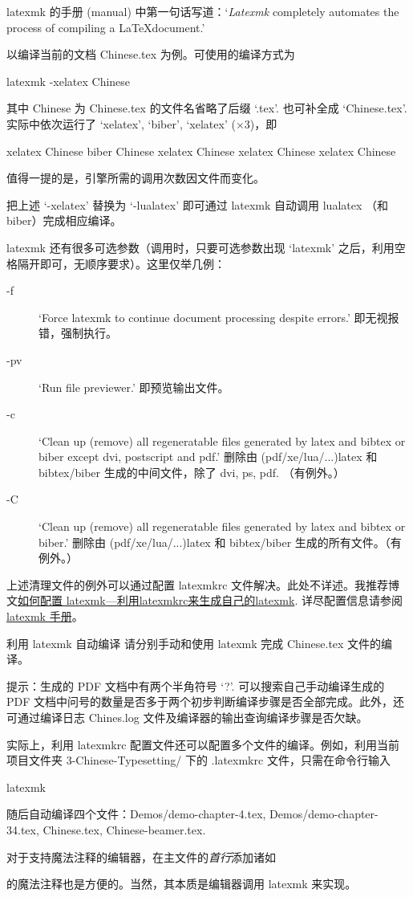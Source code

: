 latexmk 的手册 (manual)\cite{latexmk} 中第一句话写道：`\emph{Latexmk} completely automates the process of compiling a \LaTeX document.'

以编译当前的文档 Chinese.tex 为例。可使用的编译方式为
\begin{bashlst}
latexmk -xelatex Chinese
\end{bashlst}
其中 Chinese 为 Chinese.tex 的文件名省略了后缀 `.tex'. 也可补全成 `Chinese.tex'. 实际中依次运行了 `xelatex', `biber', `xelatex' ($\times 3$)，即
\begin{bashlst}[numbers=left]
xelatex Chinese
biber Chinese
xelatex Chinese
xelatex Chinese
xelatex Chinese
\end{bashlst}
值得一提的是，引擎所需的调用次数因文件而变化。

把上述 `-xelatex' 替换为 `-lualatex' 即可通过 latexmk 自动调用 lualatex （和 biber）完成相应编译。

latexmk 还有很多可选参数（调用时，只要可选参数出现 `latexmk' 之后，利用空格隔开即可，无顺序要求）。这里仅举几例：
\begin{description}
\item[-f] `Force latexmk to continue document processing despite errors.' 即无视报错，强制执行。
\item[-pv] `Run file previewer.' 即预览输出文件。
\item[-c] `Clean up (remove) all regeneratable files generated by latex and bibtex or biber except dvi, postscript and pdf.' 删除由 (pdf/xe/lua/...)latex 和 bibtex/biber 生成的中间文件，除了 dvi, ps, pdf. （有例外。）
\item[-C] `Clean up (remove) all regeneratable files generated by latex and bibtex or biber.' 删除由 (pdf/xe/lua/...)latex 和 bibtex/biber 生成的所有文件。（有例外。）
\end{description}
上述清理文件的例外可以通过配置 latexmkrc 文件解决。此处不详述。我推荐博文\href{https://blog.prosight.me/2019/05/23/latexmk/}{如何配置 latexmk---利用latexmkrc来生成自己的latexmk}. 详尽配置信息请参阅 \href{http://personal.psu.edu/jcc8//software/latexmk-jcc/}{latexmk 手册}。

\begin{Ex}{利用 latexmk 自动编译}
请分别手动和使用 latexmk 完成 Chinese.tex 文件的编译。\\ \myhrule

提示：生成的 PDF 文档中有两个半角符号 `?'. 可以搜索自己手动编译生成的 PDF 文档中问号的数量是否多于两个初步判断编译步骤是否全部完成。此外，还可通过编译日志 Chines.log 文件及编译器的输出查询编译步骤是否欠缺。
\end{Ex}

实际上，利用 latexmkrc 配置文件还可以配置多个文件的编译。例如，利用当前项目文件夹 3-Chinese-Typesetting/ 下的 .latexmkrc 文件，只需在命令行输入
\begin{bashlst}
latexmk
\end{bashlst}
随后自动编译四个文件：Demos/demo-chapter-4.tex, Demos/demo-chapter-34.tex, Chinese.tex, Chinese-beamer.tex.

对于支持魔法注释的编辑器，在主文件的\emph{首行}添加诸如
\begin{texlst}[numbers=left]
\end{texlst}
的魔法注释也是方便的。当然，其本质是编辑器调用 latexmk 来实现。